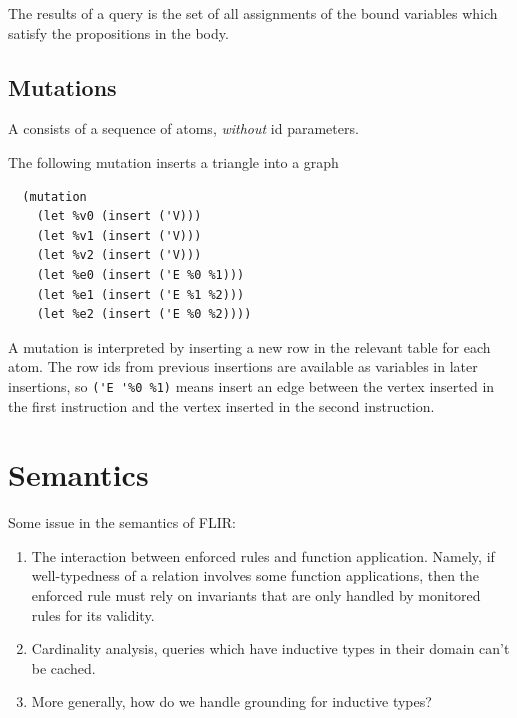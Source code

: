 \documentclass{scrartcl}
\begin{document}
The results of a query is the set of all assignments of the bound variables which satisfy the propositions in the body.

\subsection{Mutations} \label{sec:mutation}

\begin{definition}
  A  consists of a sequence of atoms, \emph{without} id parameters.
\end{definition}

\begin{example}
  The following mutation inserts a triangle into a graph
  \begin{verbatim}
  (mutation
    (let %v0 (insert ('V)))
    (let %v1 (insert ('V)))
    (let %v2 (insert ('V)))
    (let %e0 (insert ('E %0 %1)))
    (let %e1 (insert ('E %1 %2)))
    (let %e2 (insert ('E %0 %2))))
  \end{verbatim}
\end{example}
%
\noindent A mutation is interpreted by inserting a new row in the relevant table for each atom. The row ids from previous insertions are available as variables in later insertions, so \verb|('E '%0 %1)| means insert an edge between the vertex inserted in the first instruction and the vertex inserted in the second instruction.

\section{Semantics}

Some issue in the semantics of FLIR:

\begin{enumerate}
  \item The interaction between enforced rules and function application. Namely, if well-typedness of a relation involves some function applications, then the enforced rule must rely on invariants that are only handled by monitored rules for its validity.
  \item Cardinality analysis, queries which have inductive types in their domain can't be cached.
  \item More generally, how do we handle grounding for inductive types?
\end{enumerate}
\end{document}
